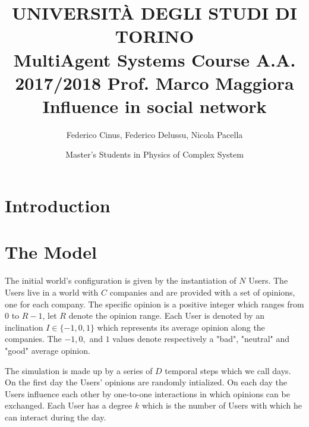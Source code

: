 \documentclass[11pt,a4paper]{article}
\author{Federico Cinus, Federico Delussu, Nicola Pacella}
\author{Master’s Students in Physics of Complex System}
\title{ \LARGE{UNIVERSIT\`{A} DEGLI STUDI DI TORINO} 
\\
MultiAgent Systems Course A.A. 2017/2018 Prof. Marco Maggiora
\\
 \textbf{Influence in social network}}
\begin{document}
\date{}
\maketitle
\bigskip


\tableofcontents

\newpage 
\section{Introduction}

\section{The Model}

\begin{comment}

SCHEMA DEL MODELLO

la classe user

	gli attributi personali dello user : opinion vector (V) /inclination (I) /percdiff (p) /degree (d)  
							       
	gli attributi statici : opinion range (R) / gamma (G) / userNumber (N) / companies (C) 
	 
		opinion vector -> tante entrate quante le companies 
			ciascun entrata può assumere un valore fra 0 e l'opinion range R
						
\end{comment}

The initial world's configuration is given by the instantiation of $N$ Users. 
The Users live in a world with $C$ companies and are provided with a set of opinions, one for each company. 
The specific opinion is a positive integer which ranges from $0$ to $R-1$, let $R$ denote the opinion range.
Each User is denoted by an inclination $I \in \{-1,0,1\}$ which represents its average opinion along the companies. The $-1, 0,$ and $1$ values denote respectively a "bad", "neutral" and "good" average opinion.  

The simulation is made up by a series of $D$ temporal steps which we call days. 
On the first day the Users' opinions are randomly intialized. 
On each day the Users influence each other by one-to-one interactions in which opinions can be exchanged.
Each User has a degree $k$ which is the number of Users with which he can interact during the day.
\end{document}
